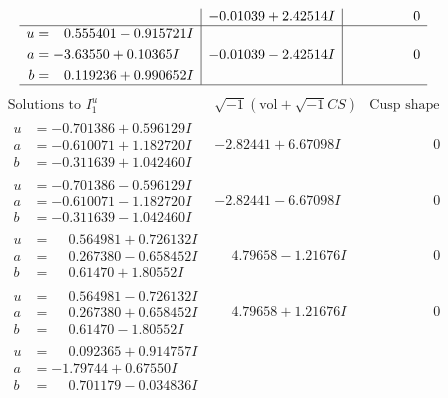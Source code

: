 \documentclass[1p]{elsarticle_modified}
\theoremstyle{definition}
\newcommand{\I}{\sqrt{-1}}
\begin{document}
$$\begin{array}{c|c|c}
 & -0.01039 + 2.42514 I & \phantom{-0.000000 } 0 \\ \hline\begin{aligned}
u &= \phantom{-}0.555401 - 0.915721 I \\
a &= -3.63550 + 0.10365 I \\
b &= \phantom{-}0.119236 + 0.990652 I\end{aligned}
 & -0.01039 - 2.42514 I & \phantom{-0.000000 } 0\\
 \hline 
 \end{array}$$\newpage$$\begin{array}{c|c|c}  
\text{Solutions to }I^u_{1}& \I (\text{vol} + \sqrt{-1}CS) & \text{Cusp shape}\\
 \hline 
\begin{aligned}
u &= -0.701386 + 0.596129 I \\
a &= -0.610071 + 1.182720 I \\
b &= -0.311639 + 1.042460 I\end{aligned}
 & -2.82441 + 6.67098 I & \phantom{-0.000000 } 0 \\ \hline\begin{aligned}
u &= -0.701386 - 0.596129 I \\
a &= -0.610071 - 1.182720 I \\
b &= -0.311639 - 1.042460 I\end{aligned}
 & -2.82441 - 6.67098 I & \phantom{-0.000000 } 0 \\ \hline\begin{aligned}
u &= \phantom{-}0.564981 + 0.726132 I \\
a &= \phantom{-}0.267380 - 0.658452 I \\
b &= \phantom{-}0.61470 + 1.80552 I\end{aligned}
 & \phantom{-}4.79658 - 1.21676 I & \phantom{-0.000000 } 0 \\ \hline\begin{aligned}
u &= \phantom{-}0.564981 - 0.726132 I \\
a &= \phantom{-}0.267380 + 0.658452 I \\
b &= \phantom{-}0.61470 - 1.80552 I\end{aligned}
 & \phantom{-}4.79658 + 1.21676 I & \phantom{-0.000000 } 0 \\ \hline\begin{aligned}
u &= \phantom{-}0.092365 + 0.914757 I \\
a &= -1.79744 + 0.67550 I \\
b &= \phantom{-}0.701179 - 0.034836 I\end{aligned}

\end{array}$$
\end{document}
